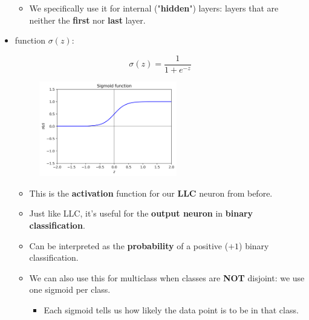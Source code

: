 \begin{itemize}
\begin{itemize}
                    \item We specifically use it for internal ("\textbf{hidden}") layers: layers that are neither the \textbf{first} nor \textbf{last} layer.
                \end{itemize}
            
            
            \item {} function $\sigma(z)$:
            
                \begin{equation}
                    \sigma(z) = \frac{1}{1+e^{-z}}
                \end{equation}
                
                \begin{figure}[H]
                    \centering
                    \includegraphics[width=60mm,scale=0.4]{images/nn_images/sigmoid_fn.png}
                \end{figure}
            
                \begin{itemize}
                    \item This is the \textbf{activation} function for our \textbf{LLC} neuron from before.
                    
                    \item Just like LLC, it's useful for the \textbf{output neuron} in \textbf{binary classification}.
                    
                    \item Can be interpreted as the \textbf{probability} of a positive ($+1$) binary classification.

                    \item We can also use this for multiclass when classes are \textbf{NOT} disjoint: we use one sigmoid per class.
                        \begin{itemize}
                            \item Each sigmoid tells us how likely the data point is to be in that class.
                        \end{itemize}
                \end{itemize}
                

\end{itemize}
